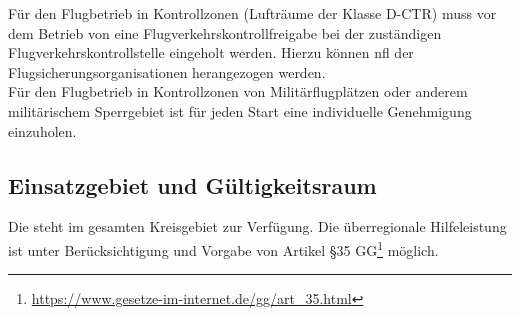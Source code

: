 Für den Flugbetrieb in Kontrollzonen (Lufträume der Klasse D-CTR) muss vor dem Betrieb von eine Flugverkehrskontrollfreigabe bei der zuständigen Flugverkehrskontrollstelle eingeholt werden. Hierzu können \ac{nfl} der Flugsicherungsorganisationen herangezogen werden.\\

\noindent Für den Flugbetrieb in Kontrollzonen von Militärflugplätzen oder anderem militärischem Sperrgebiet ist für jeden Start eine individuelle Genehmigung einzuholen.

\subsection{Einsatzgebiet und Gültigkeitsraum}

Die \callee{} steht im gesamten Kreisgebiet \district{} zur Verfügung. Die überregionale Hilfeleistung ist unter Berücksichtigung und Vorgabe von Artikel §35 GG\footnote{\url{https://www.gesetze-im-internet.de/gg/art_35.html}} möglich.
